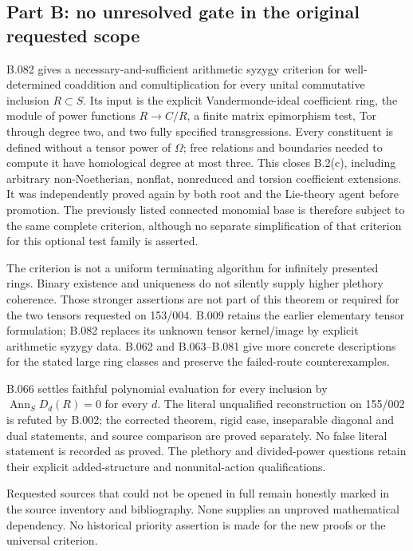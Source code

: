 \subsection*{Part B: no unresolved gate in the original requested scope}
B.082 gives a necessary-and-sufficient arithmetic syzygy criterion for
well-determined coaddition and comultiplication for every unital
commutative inclusion $R\subset S$. Its input is the explicit
Vandermonde-ideal coefficient ring, the module of power functions
$R\to C/R$, a finite matrix epimorphism test, Tor through degree two,
and two fully specified transgressions. Every constituent is defined
without a tensor power of $\Omega$; free relations and boundaries
needed to compute it have homological degree at most three.
This closes B.2(c), including arbitrary non-Noetherian, nonflat,
nonreduced and torsion coefficient extensions. It was independently
proved again by both root and the Lie-theory agent before promotion.
The previously listed connected monomial base is therefore subject
to the same complete criterion, although no separate simplification
of that criterion for this optional test family is asserted.

The criterion is not a uniform terminating algorithm for infinitely
presented rings. Binary existence and uniqueness do not silently
supply higher plethory coherence. Those stronger assertions are not
part of this theorem or required for the two tensors requested on
153/004. B.009 retains the earlier elementary tensor formulation;
B.082 replaces its unknown tensor kernel/image by explicit arithmetic
syzygy data. B.062 and B.063--B.081 give more concrete descriptions
for the stated large ring classes and preserve the failed-route
counterexamples.

B.066 settles faithful polynomial evaluation for every inclusion by
$\operatorname{Ann}_S D_d(R)=0$ for every $d$. The literal unqualified
reconstruction on 155/002 is refuted by B.002; the corrected theorem,
rigid case, inseparable diagonal and dual statements, and source
comparison are proved separately. No false literal statement is
recorded as proved. The plethory and divided-power questions retain
their explicit added-structure and nonunital-action qualifications.

Requested sources that could not be opened in full remain honestly
marked in the source inventory and bibliography. None supplies an
unproved mathematical dependency. No historical priority assertion
is made for the new proofs or the universal criterion.
